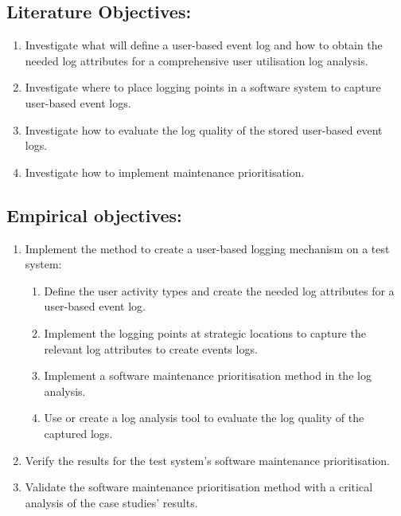\newcommand{\objAi}{Investigate what will define a user-based event log and how to obtain the needed log attributes for a comprehensive user utilisation log analysis.}
\newcommand{\objAii}{Investigate where to place logging points in a software system to capture user-based event logs.}
\newcommand{\objAiii}{Investigate how to evaluate the log quality of the stored user-based event logs.}
\newcommand{\objAiv}{Investigate how to implement maintenance prioritisation.}

\newcommand{\objBi}{Implement the method to create a user-based logging mechanism on a test system}
\newcommand{\objBiSubA}{Define the user activity types and create the needed log attributes for a user-based event log.}
\newcommand{\objBiSubB}{Implement the logging points at strategic locations to capture the relevant log attributes to create events logs.}
\newcommand{\objBiSubC}{Use or create a log analysis tool to evaluate the log quality of the captured logs.}
\newcommand{\objBiSubD}{Implement a software maintenance prioritisation method in the log analysis.}
\newcommand{\objBii}{Verify the results for the test system's software maintenance prioritisation.}
\newcommand{\objBiii}{Validate the software maintenance prioritisation method with a critical analysis of the case studies' results.}


\subsection{Literature Objectives:}\label{sec:ch1_literatureObjective}
\begin{enumerate}
	\item \objAi
	\item \objAii
	\item \objAiii
	\item \objAiv 
\end{enumerate}

\subsection{Empirical objectives:}\label{sec:ch1_empiricalObjective}
\begin{enumerate}
	\item \objBi: 
		\begin{enumerate}
			\item \objBiSubA
			\item \objBiSubB
			\item \objBiSubD
			\item \objBiSubC
		\end{enumerate}
	\item \objBii
	\item \objBiii
\end{enumerate}

